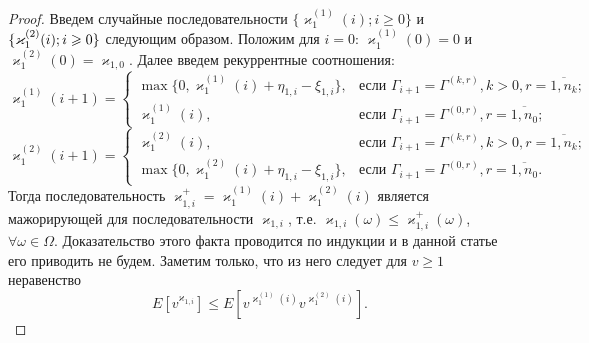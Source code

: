 \documentclass[a4paper,twoside]{article}
\theoremstyle{theorem}
\theoremstyle{remark}
\renewcommand*{\hm}[1]{#1\nobreak\discretionary{}%
	{\hbox{$\mathsurround=0pt #1$}}{}}%
\begin{document}
\begin{proof}
 Введем случайные последовательности $\{\varkappa_{1}^{(1)}(i); i\geqslant0\}$ и $\{\varkappa_{1}^{(2)}(i); i \hm\geqslant 0\}$ следующим образом. Положим для $i=0$: $\varkappa_{1}^{(1)}(0)=0$ и $\varkappa_{1}^{(2)}(0)=\varkappa_{1,0}$. Далее введем рекуррентные соотношения:  
\begin{equation*}
  \varkappa_{1}^{(1)}(i+1) =
  \begin{cases}
    \max{\{0,\varkappa_{1}^{(1)}(i) + \eta_{1,i} - \xi_{1,i}\}},&  \text{если } \Gamma_{i+1}=\Gamma^{(k,r)}, k>0, r=\overline{1,n_k}; \\
    \varkappa_{1}^{(1)}(i),&  \text{если } \Gamma_{i+1}=\Gamma^{(0,r)}, r=\overline{1,n_0};
  \end{cases}
\end{equation*}
\begin{equation*}
  \varkappa_{1}^{(2)}(i+1) =
  \begin{cases}
    \varkappa_{1}^{(2)}(i),&  \text{если } \Gamma_{i+1}=\Gamma^{(k,r)}, k>0, r=\overline{1,n_k};\\
    \max{\{0,\varkappa_{1}^{(2)}(i) + \eta_{1,i} - \xi_{1,i}\}},&  \text{если } \Gamma_{i+1}=\Gamma^{(0,r)}, r=\overline{1,n_0}.
  \end{cases}
\end{equation*}
Тогда последовательность $\varkappa_{1,i}^+=\varkappa_{1}^{(1)}(i) + \varkappa_{1}^{(2)}(i)$ является мажорирующей для последовательности $\varkappa_{1,i}$, т.е. $\varkappa_{1,i}(\omega) \leqslant \varkappa_{1,i}^+(\omega)$, $\forall \omega \in \Omega$. Доказательство этого факта проводится по индукции и в данной статье его приводить не будем. Заметим только, что из него следует для $v\geqslant 1$ неравенство
\begin{equation}
E[v^{\varkappa_{1,i}}]\leqslant E[v^{\varkappa_{1}^{(1)}(i)} v^{\varkappa_{1}^{(2)}(i)}].
\label{cenzor:estimate}
\end{equation}
                               


\end{proof}
\end{document}
